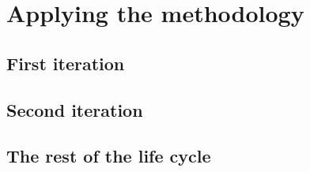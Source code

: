 
\chapter{Applying the methodology} %

\label{Chapter 3} %

\section{First iteration}

\section{Second iteration}

\section{The rest of the life cycle}
